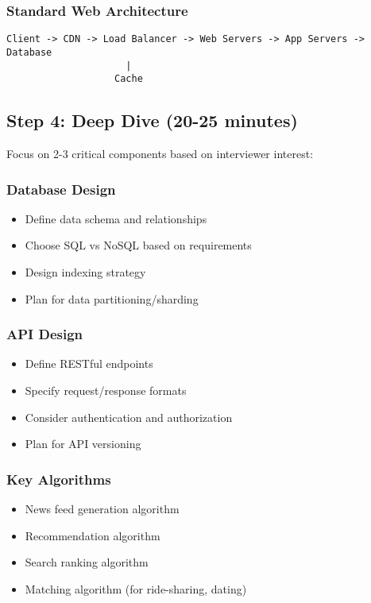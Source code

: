 \documentclass[10pt,a4paper]{article}
\begin{document}
\subsubsection{Standard Web Architecture}
\begin{verbatim}
Client -> CDN -> Load Balancer -> Web Servers -> App Servers -> Database
                     |
                   Cache
\end{verbatim}

\subsection{Step 4: Deep Dive (20-25 minutes)}

Focus on 2-3 critical components based on interviewer interest:

\subsubsection{Database Design}
\begin{itemize}
\item Define data schema and relationships
\item Choose SQL vs NoSQL based on requirements
\item Design indexing strategy
\item Plan for data partitioning/sharding
\end{itemize}

\subsubsection{API Design}
\begin{itemize}
\item Define RESTful endpoints
\item Specify request/response formats
\item Consider authentication and authorization
\item Plan for API versioning
\end{itemize}

\subsubsection{Key Algorithms}
\begin{itemize}
\item News feed generation algorithm
\item Recommendation algorithm
\item Search ranking algorithm
\item Matching algorithm (for ride-sharing, dating)
\end{itemize}
\end{document}
